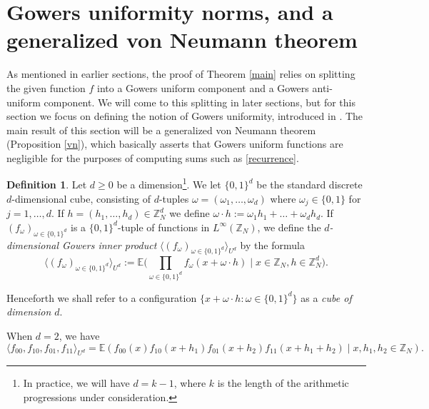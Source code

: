 \documentclass[12pt,a4paper,reqno]{amsart}
\numberwithin{equation}{section}
\theoremstyle{plain}
\theoremstyle{definition}
\newtheorem{definition}[subsection]{Definition}
\renewcommand{\geq}{\geqslant}
\def\Z{{\mathbb Z}}
\def\E{{\mathbb E}}
\def\vs{\vspace{11pt}}
\def\ni{\noindent}
\def\emph#1{{\it #1}}
\begin{document}
\section{Gowers uniformity norms, and a generalized von Neumann theorem}\label{sec5}

\ni As mentioned in earlier sections, the proof of Theorem \ref{main} relies on splitting the given function $f$ into
a Gowers uniform component and a Gowers anti-uniform component.  We will come to this splitting in later sections, but for this section
we focus on defining the notion of Gowers uniformity, introduced in \cite{gowers-4,gowers}.  The main result of
this section will be a generalized von Neumann theorem (Proposition \ref{vn}), which basically asserts that Gowers uniform functions
are negligible for the purposes of computing sums such as \eqref{recurrence}.

\begin{definition}  Let $d \geq 0$ be a dimension\footnote{In practice, we will have $d = k-1$, where $k$ is the 
length of the arithmetic progressions under consideration.}.  We let $\{0,1\}^d$ be the standard discrete $d$-dimensional
cube, consisting of $d$-tuples $\omega = (\omega_1,\ldots,\omega_d)$ where $\omega_j \in \{0,1\}$ for $j=1,\ldots,d$.
If $h = (h_1,\ldots,h_d)
\in \mathbb{Z}_N^d$ we define $\omega \cdot h := \omega_1 h_1 + \ldots + \omega_d h_d$.  If $(f_\omega)_{\omega \in \{0,1\}^d}$
is a $\{0,1\}^d$-tuple of functions in $L^\infty(\mathbb{Z}_N)$, we define the \emph{$d$-dimensional Gowers inner product}
$\langle (f_\omega)_{\omega \in \{0,1\}^d} \rangle_{U^d}$ by the formula
\begin{equation}\label{inner-def}
 \langle (f_\omega)_{\omega \in \{0,1\}^d} \rangle_{U^d}
:= \E\bigg( \prod_{\omega \in \{0,1\}^d} f_\omega(x + \omega \cdot h) \; \bigg| \; x \in \mathbb{Z}_N, h \in \mathbb{Z}_N^d \bigg).
\end{equation}
\end{definition}

\ni Henceforth we shall refer to a configuration $\{x + \omega \cdot h : \omega \in \{0,1\}^d\}$ as a \emph{cube of dimension $d$}.\vs

\ni \emph{Example.}  When $d=2$, we have
$$ \langle f_{00}, f_{10}, f_{01}, f_{11} \rangle_{U^d} =
\E( f_{00}(x) f_{10}(x+h_1) f_{01}(x+h_2) f_{11}(x+h_1+h_2) \; | \; x, h_1, h_2 \in \Z_N ).$$
\end{document}
